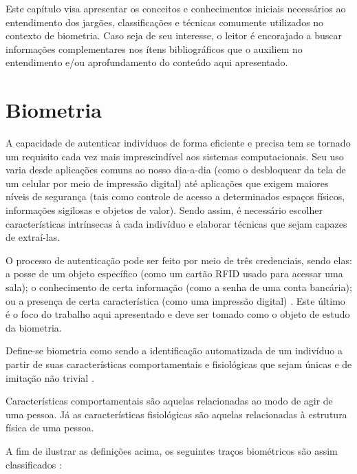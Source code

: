 Este capítulo visa apresentar os conceitos e conhecimentos iniciais necessários ao entendimento dos jargões, classificações e técnicas comumente utilizados no contexto de biometria. Caso seja de seu interesse, o leitor é encorajado a buscar informações complementares nos ítens bibliográficos que o auxiliem no entendimento e/ou aprofundamento do conteúdo aqui apresentado.

\section{Biometria}%
A capacidade de autenticar indivíduos de forma eficiente e precisa tem se tornado um requisito cada vez mais imprescindível aos sistemas computacionais. Seu uso varia desde aplicações comuns ao nosso dia-a-dia (como o desbloquear da tela de um celular por meio de impressão digital) até aplicações que exigem maiores níveis de segurança (tais como controle de acesso a determinados espaços físicos, informações sigilosas e objetos de valor). Sendo assim, é necessário escolher características intrínsecas à cada indivíduo e elaborar técnicas que sejam capazes de extraí-las.

O processo de autenticação pode ser feito por meio de três credenciais, sendo elas: a posse de um objeto específico (como um cartão RFID usado para acessar uma sala); o conhecimento de certa informação (como a senha de uma conta bancária); ou a presença de certa característica (como uma impressão digital) \cite{vital_signs}. Este último é o foco do trabalho aqui apresentado e deve ser tomado como o objeto de estudo da biometria.

Define-se biometria como sendo a identificação automatizada de um indivíduo a partir de suas características comportamentais e fisiológicas que sejam únicas e de imitação não trivial \cite{guidelines_practices, clarke}.

Características comportamentais são aquelas relacionadas ao modo de agir de uma pessoa. Já as características fisiológicas são aquelas relacionadas à estrutura física de uma pessoa.

A fim de ilustrar as definições acima, os seguintes traços biométricos são assim classificados \cite{biometric_systems, introducao_biometria}:

